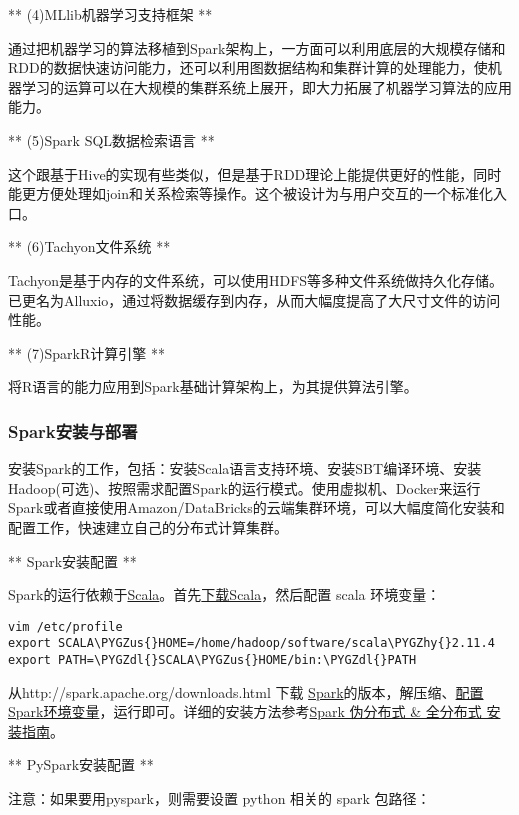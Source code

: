 \documentclass[letterpaper,10pt,english]{sphinxmanual}
\def\PYGZus{\char`\_}
\def\PYGZdl{\char`\$}
\def\PYGZhy{\char`\-}
\begin{document}
** (4)MLlib机器学习支持框架 **

通过把机器学习的算法移植到Spark架构上，一方面可以利用底层的大规模存储和RDD的数据快速访问能力，还可以利用图数据结构和集群计算的处理能力，使机器学习的运算可以在大规模的集群系统上展开，即大力拓展了机器学习算法的应用能力。

** (5)Spark SQL数据检索语言 **

这个跟基于Hive的实现有些类似，但是基于RDD理论上能提供更好的性能，同时能更方便处理如join和关系检索等操作。这个被设计为与用户交互的一个标准化入口。

** (6)Tachyon文件系统 **

Tachyon是基于内存的文件系统，可以使用HDFS等多种文件系统做持久化存储。已更名为Alluxio，通过将数据缓存到内存，从而大幅度提高了大尺寸文件的访问性能。

** (7)SparkR计算引擎 **

将R语言的能力应用到Spark基础计算架构上，为其提供算法引擎。


\subsubsection{Spark安装与部署}
\label{gispark_paas:Spark_u5b89_u88c5_u4e0e_u90e8_u7f72}
安装Spark的工作，包括：安装Scala语言支持环境、安装SBT编译环境、安装Hadoop(可选)、按照需求配置Spark的运行模式。使用虚拟机、Docker来运行Spark或者直接使用Amazon/DataBricks的云端集群环境，可以大幅度简化安装和配置工作，快速建立自己的分布式计算集群。

** Spark安装配置 **

Spark的运行依赖于\href{http://www.scala-lang.org/}{Scala}。首先\href{http://www.scala-lang.org/download/}{下载Scala}，然后配置
scala 环境变量：

\begin{Verbatim}[commandchars=\\\{\}]
vim /etc/profile
export SCALA\PYGZus{}HOME=/home/hadoop/software/scala\PYGZhy{}2.11.4
export PATH=\PYGZdl{}SCALA\PYGZus{}HOME/bin:\PYGZdl{}PATH
\end{Verbatim}

从http://spark.apache.org/downloads.html 下载
\href{http://spark.apache.org}{Spark}的版本，解压缩、\href{http://my.oschina.net/u/2306127/blog/550421}{配置Spark环境变量}，运行即可。详细的安装方法参考\href{http://my.oschina.net/leejun2005/blog/394928}{Spark
伪分布式 \& 全分布式
安装指南}。

** PySpark安装配置 **

注意：如果要用pyspark，则需要设置 python 相关的 spark 包路径：
\end{document}
